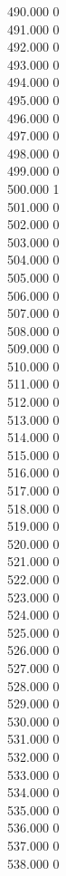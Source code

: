 { 490.000	0 \\
 491.000	0 \\
 492.000	0 \\
 493.000	0 \\
 494.000	0 \\
 495.000	0 \\
 496.000	0 \\
 497.000	0 \\
 498.000	0 \\
 499.000	0 \\
 500.000	1 \\
 501.000	0 \\
 502.000	0 \\
 503.000	0 \\
 504.000	0 \\
 505.000	0 \\
 506.000	0 \\
 507.000	0 \\
 508.000	0 \\
 509.000	0 \\
 510.000	0 \\
 511.000	0 \\
 512.000	0 \\
 513.000	0 \\
 514.000	0 \\
 515.000	0 \\
 516.000	0 \\
 517.000	0 \\
 518.000	0 \\
 519.000	0 \\
 520.000	0 \\
 521.000	0 \\
 522.000	0 \\
 523.000	0 \\
 524.000	0 \\
 525.000	0 \\
 526.000	0 \\
 527.000	0 \\
 528.000	0 \\
 529.000	0 \\
 530.000	0 \\
 531.000	0 \\
 532.000	0 \\
 533.000	0 \\
 534.000	0 \\
 535.000	0 \\
 536.000	0 \\
 537.000	0 \\
 538.000	0 \\
}
